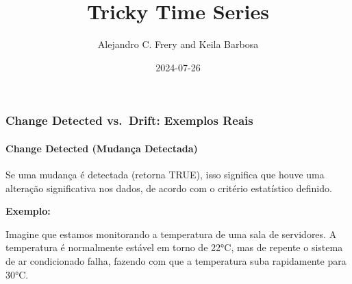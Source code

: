 \documentclass[
]{article}
\title{Tricky Time Series}
\author{Alejandro C. Frery and Keila Barbosa}
\date{2024-07-26}
\begin{document}
\maketitle

\hypertarget{change-detected-vs.-drift-exemplos-reais}{%
\subsubsection{Change Detected vs.~Drift: Exemplos
Reais}\label{change-detected-vs.-drift-exemplos-reais}}

\hypertarget{change-detected-mudanuxe7a-detectada}{%
\paragraph{Change Detected (Mudança
Detectada)}\label{change-detected-mudanuxe7a-detectada}}

Se uma mudança é detectada (retorna TRUE), isso significa que houve uma
alteração significativa nos dados, de acordo com o critério estatístico
definido.

\textbf{Exemplo:}

Imagine que estamos monitorando a temperatura de uma sala de servidores.
A temperatura é normalmente estável em torno de 22°C, mas de repente o
sistema de ar condicionado falha, fazendo com que a temperatura suba
rapidamente para 30°C.
\end{document}

